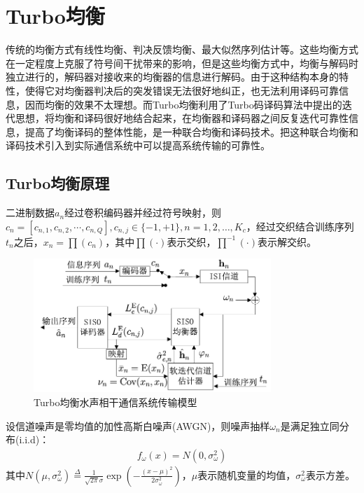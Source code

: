 \section{Turbo均衡}
传统的均衡方式有线性均衡、判决反馈均衡、最大似然序列估计等。这些均衡方式在一定程度上克服了符号间干扰带来的影响，但是这些均衡方式中，均衡与解码时独立进行的，解码器对接收来的均衡器的信息进行解码。由于这种结构本身的特性，使得它对均衡器判决后的突发错误无法很好地纠正，也无法利用译码可靠信息，因而均衡的效果不太理想。而Turbo均衡利用了Turbo码译码算法中提出的迭代思想，将均衡和译码很好地结合起来，在均衡器和译码器之间反复迭代可靠性信息，提高了均衡译码的整体性能，是一种联合均衡和译码技术。把这种联合均衡和译码技术引入到实际通信系统中可以提高系统传输的可靠性。
\subsection{Turbo均衡原理}
二进制数据$a_n$经过卷积编码器并经过符号映射，则$c_n=[c_{n,1},c_{n,2},\cdots,c_{n,Q}],c_{n,j}\in\{-1,+1\},n=1,2,\ldots,K_c$，经过交织结合训练序列$t_n$之后，$x_n=\prod(c_n)$，其中$\prod(\cdot)$表示交织，$\prod^{-1}(\cdot)$表示解交织。

\begin{figure}[htb]
  \begin{center}
    \includegraphics[width=0.8\textwidth]{images/totalcomm2.pdf}
  \end{center}
  \caption{Turbo均衡水声相干通信系统传输模型}
  \label{fig:2.4}
\end{figure}

设信道噪声是零均值的加性高斯白噪声(AWGN)，则噪声抽样$\omega_n$是满足独立同分布(i.i.d)：
\begin{eqnarray}
    f_{\omega}(x)=N(0,\sigma_{\omega}^2)
    \label{equ:2.32}
\end{eqnarray}
其中$N(\mu,\sigma_{\omega}^2)\overset{\Delta}{=}\frac{1}{\sqrt{2\pi}\sigma}\exp\left(-\frac{(x-\mu)^2}{2\sigma_{\omega}^2}\right)$，$\mu$表示随机变量的均值，$\sigma_{\omega}^2$表示方差。

